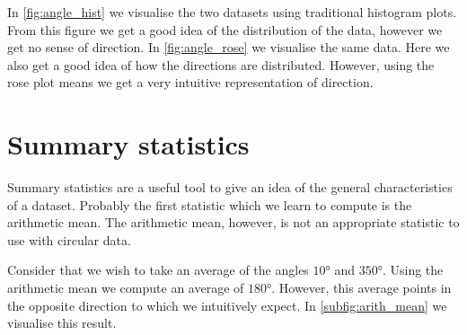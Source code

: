 In \cref{fig:angle_hist} we visualise the two datasets using traditional
histogram plots. From this figure we get a good idea of the distribution of the
data, however we get no sense of direction. In \cref{fig:angle_rose} we
visualise the same data. Here we also get a good idea of how the directions are
distributed. However, using the rose plot means we get a very intuitive
representation of direction. 

\section{Summary statistics}
\label{sec:summary_stats}

Summary statistics are a useful tool to give an idea of the general
characteristics of a dataset. Probably the first statistic which we learn to
compute is the arithmetic mean. The arithmetic mean, however, is not an
appropriate statistic to use with circular data.

Consider that we wish to take an average of the angles $\ang{10}$ and
$\ang{350}$. Using the arithmetic mean we compute an average of $\ang{180}$.
However, this average points in the opposite direction to which we intuitively
expect. In \cref{subfig:arith_mean} we visualise this result.

